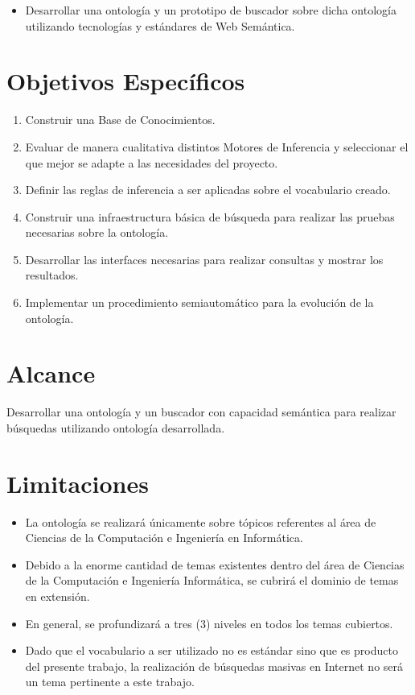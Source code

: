 \begin{itemize}
\item Desarrollar una ontología y un prototipo de buscador sobre dicha ontología utilizando tecnologías y estándares de Web Semántica.
\end{itemize}

\section{Objetivos Específicos }

\begin{enumerate}
    \item Construir una Base de Conocimientos.
    \item Evaluar de manera cualitativa distintos Motores de Inferencia y seleccionar el que mejor se adapte a las necesidades del proyecto.
    \item Definir las reglas de inferencia a ser aplicadas sobre el vocabulario creado.
    \item Construir una infraestructura básica de búsqueda para realizar las pruebas necesarias sobre la ontología.
    \item Desarrollar las interfaces necesarias para realizar consultas y mostrar los resultados.
    \item Implementar un procedimiento semiautomático para la evolución de la ontología.
\end{enumerate}


\section{Alcance }

Desarrollar una ontología y un buscador con capacidad semántica para realizar búsquedas utilizando ontología desarrollada.


\section{Limitaciones }

\begin{itemize}
\item La ontología se realizará únicamente sobre tópicos referentes al área de Ciencias de la Computación e Ingeniería en Informática.
\item Debido a la enorme cantidad de temas existentes dentro del área de Ciencias de la Computación e Ingeniería Informática, se cubrirá el dominio de temas en extensión.
\item En general, se profundizará a tres (3) niveles en todos los temas cubiertos.
\item Dado que el vocabulario a ser utilizado no es estándar sino que es producto del presente trabajo, la realización de búsquedas masivas en Internet no será un tema pertinente a este trabajo.

\end{itemize}

